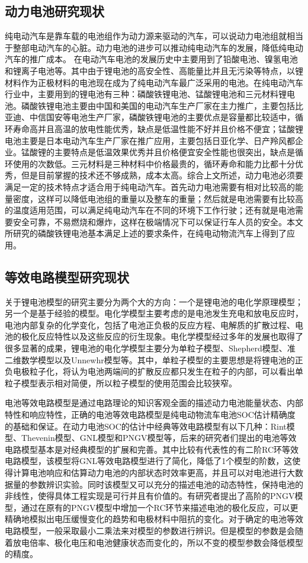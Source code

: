 	\subsection{动力电池研究现状}
	纯电动汽车是靠车载的电池组作为动力源来驱动的汽车，可以说动力电池组就相当于整部电动汽车的心脏。动力电池的进步可以推动纯电动汽车的发展，降低纯电动汽车的推广成本。
在电动汽车电池的发展历史中主要用到了铅酸电池、镍氢电池和锂离子电池等。其中由于锂电池的高安全性、高能量比并且无污染等特点，以锂材料作为正极材料的电池现在成为了纯电动汽车最广泛采用的电池。在纯电动汽车行业中，主要用到的锂电池有三种：磷酸铁锂电池、锰酸锂电池和三元材料锂电池。磷酸铁锂电池主要由中国和美国的电动汽车生产厂家在主力推广，主要包括比亚迪、中信国安等电池生产厂家，磷酸铁锂电池的主要优点是容量都比较适中，循环寿命高并且高温的放电性能优秀，缺点是低温性能不好并且价格不便宜；锰酸锂电池主要是日本电动汽车生产厂家在推广应用，主要包括日亚化学、日产羚风都企业。锰酸锂的主要特点是低温效果优秀并且价格便宜安全性能也很突出，缺点是循环使用的次数低。三元材料是三种材料中价格最贵的，循环寿命和能力比都十分优秀，但是目前掌握的技术还不够成熟，成本太高。综合上文所述，动力电池必须要满足一定的技术特点才适合用于纯电动汽车。首先动力电池需要有相对比较高的能量密度，这样可以降低电池组的重量以及整车的重量；然后就是电池需要有比较高的温度适用范围，可以满足纯电动汽车在不同的环境下工作行驶；还有就是电池需要安全可靠，不易燃烧和爆炸，这样在极端情况下可以保证行车人员的安全。本文所研究的磷酸铁锂电池基本满足上述的要求条件，在纯电动物流汽车上得到了应用。
	\subsection{等效电路模型研究现状}
	关于锂电池模型的研究主要分为两个大的方向：一个是锂电池的电化学原理模型；另一个是基于经验的模型。电化学模型主要考虑的是电池发生充电和放电反应时，电池内部复杂的化学变化，包括了电池正负极的反应方程、电解质的扩散过程、电池的极化反应特性以及这些反应的衍生现象。电化学模型经过多年的发展也取得了很多显著的成果，锂电池的电化学模型主要分为单粒子模型、Shepherd模型、准二维数学模型以及Unnewhr模型等。其中，单粒子模型的主要思想是将锂电池的正负电极粒子化，将认为电池两端间的扩散反应都只发生在粒子的内部，可以看出单粒子模型表示相对简便，所以粒子模型的使用范围会比较狭窄。

电池等效电路模型是通过电路理论的知识客观全面的描述动力电池能量状态、内部特性和响应特性，正确的电池等效电路模型是纯电动物流车电池SOC估计精确度的基础和保证。在动力电池SOC的估计中经典等效电路模型有以下几种：Rint模型、Thevenin模型、GNL模型和PNGV模型等，后来的研究者们提出的电池等效电路模型基本是对经典模型的扩展和完善。其中比较有代表性的有二阶RC环等效电路模型，该模型将GNL等效电路模型进行了简化，降低了1个模型的阶数，这使得计算电池响应和估算动力电池的内部状态时效率更高，并且可以对电池进行大数据量的参数辨识实验。同时该模型又可以充分的描述电池的动态特性，保持电池的非线性，使得具体工程实现是可行并且有价值的。有研究者提出了高阶的PNGV模型，通过在原有的PNGV模型中增加一个RC环节来描述电池的极化反应，可以更精确地模拟出电压缓慢变化的趋势和电极材料中阻抗的变化。对于确定的电池等效电路模型，一般采取最小二乘法来对模型的参数进行辨识。但是模型的参数是会随着放电倍率、极化电压和电池健康状态而变化的，所以不变的模型参数会降低模型的精度。
